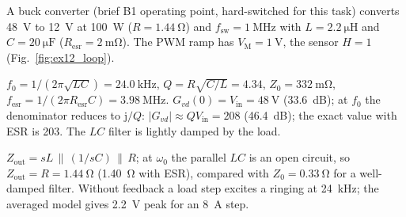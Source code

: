 


A buck converter (brief B1 operating point, hard-switched for this task) converts \SI{48}{\volt} to \SI{12}{\volt} at \SI{100}{\watt} ($R=\SI{1.44}{\ohm}$) and $f_\mathrm{sw}=\SI{1}{\mega\hertz}$ with $L=\SI{2.2}{\micro\henry}$ and $C=\SI{20}{\micro\farad}$ ($R_\mathrm{esr}=\SI{2}{\milli\ohm}$). The PWM ramp has $V_\mathrm{M}=\SI{1}{\volt}$, the sensor $H=1$ (Fig.~\ref{fig:ex12_loop}).




\begin{solutionblock}
	$f_0=1/(2\pi\sqrt{LC})=\SI{24.0}{\kilo\hertz}$, $Q=R\sqrt{C/L}=4.34$, $Z_0=\SI{332}{\milli\ohm}$, $f_\mathrm{esr}=1/(2\pi R_\mathrm{esr}C)=\SI{3.98}{\mega\hertz}$. $G_{vd}(0)=V_\mathrm{in}=\SI{48}{\volt}$ (\SI{33.6}{dB}); at $f_0$ the denominator reduces to $\mathrm{j}/Q$: $|G_{vd}|\approx QV_\mathrm{in}=208$ (\SI{46.4}{dB}); the exact value with ESR is 203. The $LC$ filter is lightly damped by the load.
\end{solutionblock}


\begin{solutionblock}
	$Z_\mathrm{out}=sL\,\|\,(1/sC)\,\|\,R$; at $\omega_0$ the parallel $LC$ is an open circuit, so $Z_\mathrm{out}=R=\SI{1.44}{\ohm}$ (\SI{1.40}{\ohm} with ESR), compared with $Z_0=\SI{0.33}{\ohm}$ for a well-damped filter. Without feedback a load step excites a ringing at \SI{24}{\kilo\hertz}; the averaged model gives \SI{2.2}{\volt} peak for an \SI{8}{\ampere} step.
\end{solutionblock}



